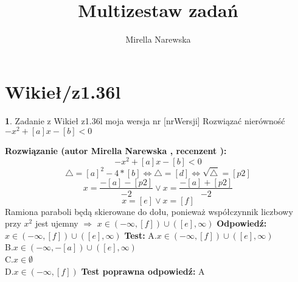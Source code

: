 \documentclass[12pt, a4paper]{article}
\title{Multizestaw zadań}
\author{Mirella Narewska}
\date{}
\theoremstyle{definition} %
\newtheorem{zad}{}
\newcommand{\kategoria}[1]{\section{#1}} %
\newcommand{\zadStart}[1]{\begin{zad}#1\newline} %
\newcommand{\zadStop}{\end{zad}}   %
\newcommand{\rozwStart}[2]{\noindent \textbf{Rozwiązanie (autor #1 , recenzent #2): }\newline} %
\newcommand{\rozwStop}{\newline}                                            %
\newcommand{\odpStart}{\noindent \textbf{Odpowiedź:}\newline}    %
\newcommand{\odpStop}{\newline}                                             %
\newcommand{\testStart}{\noindent \textbf{Test:}\newline} %
\newcommand{\testStop}{\newline} %
\newcommand{\kluczStart}{\noindent \textbf{Test poprawna odpowiedź:}\newline} %
\newcommand{\kluczStop}{\newline} %
\begin{document}
\maketitle


\kategoria{Wikieł/z1.36l}
\zadStart{Zadanie z Wikieł z1.36l  moja wersja nr [nrWersji]}
Rozwiązać nierówność $-x^2+[a]x-[b]<0$
\zadStop
\rozwStart{Mirella Narewska}{}
$$-x^2+[a]x-[b]<0$$
$$\triangle=[a]^2-4*[b] \Leftrightarrow \triangle=[d] \Leftrightarrow \sqrt{\triangle}=[p2]$$
$$x=\frac{-[a]-[p2]}{-2} \vee x=\frac{-[a]+[p2]}{-2}$$
$$x=[e] \vee x=[f]$$
Ramiona paraboli będą skierowane do dołu, ponieważ współczynnik liczbowy przy $x^2$ jest ujemny $\Rightarrow$ $x \in (-\infty, [f]) \cup ([e], \infty)$
\rozwStop
\odpStart
$x \in (-\infty, [f]) \cup ([e], \infty)$
\odpStop
\testStart
A.$x \in (-\infty, [f]) \cup ([e], \infty)$
\\
B.$x \in (-\infty, -[a]) \cup ([e], \infty)$
\\
C.$x \in \emptyset$
\\
D.$x \in (-\infty, [f])$
\testStop
\kluczStart
A
\kluczStop
\end{document}
